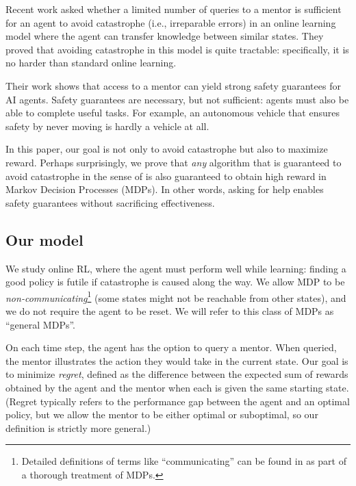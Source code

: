 Recent work \citep{plaut_avoiding_2024} asked whether a limited number of queries to a mentor is sufficient for an agent to avoid catastrophe (i.e., irreparable errors) in an online learning model where the agent can transfer knowledge between similar states. They proved that avoiding catastrophe in this model is quite tractable: specifically, it is no harder than standard online learning. 

Their work shows that access to a mentor can yield strong safety guarantees for AI agents. Safety guarantees are necessary, but not sufficient: agents must also be able to complete useful tasks. For example, an autonomous vehicle that ensures safety by never moving is hardly a vehicle at all.

In this paper, our goal is not only to avoid catastrophe but also to maximize reward. Perhaps surprisingly, we prove that \emph{any} algorithm that is guaranteed to avoid catastrophe in the sense of \citet{plaut_avoiding_2024} is also guaranteed to obtain high reward in Markov Decision Processes (MDPs). In other words, asking for help enables safety guarantees without sacrificing effectiveness.

\subsection{Our model}\label{sec:model}

We study online RL, where the agent must perform well while learning: finding a good policy is futile if catastrophe is caused along the way. We allow MDP to be \emph{non-communicating}\footnote{Detailed definitions of terms like ``communicating'' can be found in \citet{puterman2014markov} as part of a thorough treatment of MDPs.} (some states might not be reachable from other states), and we do not require the agent to be reset. We will refer to this class of MDPs as ``general MDPs''.

On each time step, the agent has the option to query a mentor. When queried, the mentor illustrates the action they would take in the current state. Our goal is to minimize \emph{regret}, defined as the difference between the expected sum of rewards obtained by the agent and the mentor when each is given the same starting state. (Regret typically refers to the performance gap between the agent and an optimal policy, but we allow the mentor to be either optimal or suboptimal, so our definition is strictly more general.)

